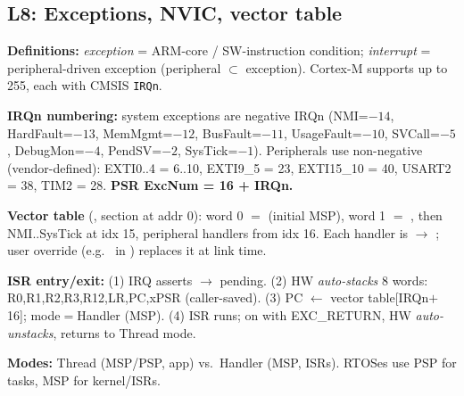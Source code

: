 \subsection{L8: Exceptions, NVIC, vector table}
\textbf{Definitions:} \emph{exception} = ARM-core / SW-instruction condition; \emph{interrupt} = peripheral-driven exception (peripheral $\subset$ exception). Cortex-M supports up to 255, each with CMSIS \texttt{IRQn}.

\textbf{IRQn numbering:} system exceptions are negative IRQn (NMI=$-14$, HardFault=$-13$, MemMgmt=$-12$, BusFault=$-11$, UsageFault=$-10$, SVCall=$-5$, DebugMon=$-4$, PendSV=$-2$, SysTick=$-1$). Peripherals use non-negative (vendor-defined): EXTI0..4 = 6..10, EXTI9\_5 = 23, EXTI15\_10 = 40, USART2 = 38, TIM2 = 28. \textbf{PSR ExcNum = 16 + IRQn.}

\textbf{Vector table} (, section  at addr 0): word 0 $=$  (initial MSP), word 1 $=$ , then NMI..SysTick at idx 15, peripheral handlers from idx 16. Each handler is  $\to$ ; user override (e.g.\  in ) replaces it at link time.

\textbf{ISR entry/exit:} (1) IRQ asserts $\to$ pending. (2) HW \emph{auto-stacks} 8 words: R0,R1,R2,R3,R12,LR,PC,xPSR (caller-saved). (3) PC $\leftarrow$ vector table[IRQn$+$16]; mode$=$Handler (MSP). (4) ISR runs; on  with EXC\_RETURN, HW \emph{auto-unstacks}, returns to Thread mode.

\textbf{Modes:} Thread (MSP/PSP, app) vs.\ Handler (MSP, ISRs). RTOSes use PSP for tasks, MSP for kernel/ISRs.

